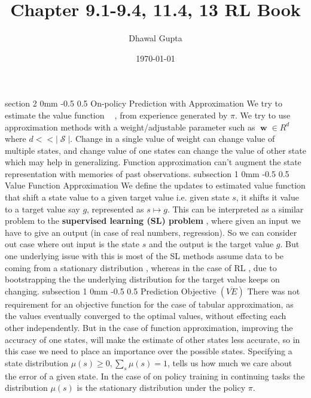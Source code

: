 \documentclass[twocolumn,11pt]{article}
\title{Chapter 9.1-9.4, 11.4, 13 RL Book \cite{sutton2018reinforcement}}
\author{Dhawal Gupta}
\date{\today}
\makeatletter
\DeclareMathOperator{\w}{\textbf{w}}
\DeclareMathOperator{\state}{\mathcal{S}}
\DeclareMathOperator{\vp}{v_\pi} %
\renewcommand{\section}{\@startsection
{section}%
{2}%
{0mm}%
{-0.5\baselineskip}%
{0.5\baselineskip}%
{\bfseries\color{blue}}} %
\renewcommand{\subsection}{\@startsection
{subsection}%
{1}%
{0mm}%
{-0.5\baselineskip}%
{0.5\baselineskip}%
{\bfseries\color{blue}}} %
\makeatother
\begin{document}
\maketitle


\section{On-policy Prediction with Approximation}
We try  to estimate the  value function $\vp$ ,  from experience generated by $\pi$. We try to use approximation methods with a weight/adjustable parameter such as $\w \in R^d$ where $d << |\state|$. Change in a single value of  weight  can  change value of multiple states, and change value of one states can change  the value of other state which  may help in generalizing. Function approximation can't augment the state representation with memories of past observations. 
\subsection{Value Function Approximation}
We define  the updates to estimated value function that shift a  state value to a given target value i.e. given state $s$, it  shifts it  value to a target value say $g$, represented as $s \mapsto g$. This can be interpreted as a similar problem to the \textbf{supervised learning (SL) problem }, where given  an input we have to give an  output (in case of real numbers, regression).  So we  can  consider out case where  out input is the state $s$ and the output is the target value $g$. But one underlying issue with this is most of  the SL methods assume data  to be coming from a stationary distribution , whereas  in the case of RL , due to bootstrapping the  the underlying  distribution for the target value keeps on changing.
\subsection{Prediction Objective $(\overline{VE})$}
There was not requirement for an objective function for the case of tabular approximation, as the values eventually converged to the optimal values, without effecting each other independently. 
But in the case of function approximation, improving the accuracy of one states, will make the estimate of other  states  less accurate, so in this  case we need to place an importance over the possible states.
Specifying a state distribution $\mu(s) \geq 0, \sum_s \mu(s) =  1$, tells us how much we care about the error of a given state. In the case of on policy training in continuing tasks the distribution $\mu(s)$ is the  stationary distribution under the policy $\pi$.
\end{document}
